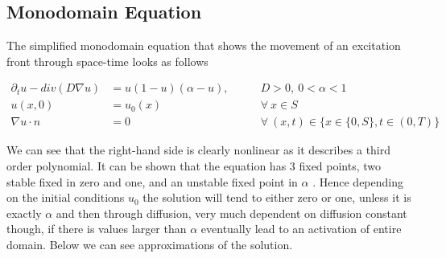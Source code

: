 \documentclass[../draft_1.tex]{subfiles}
\begin{document}
\subsection{Monodomain Equation}

The simplified monodomain equation that shows the movement of an excitation front through space-time looks as follows

\begin{ceqn}
	\begin{equation}
	\begin{aligned}
	\partial_t u - div(D \nabla u) &= u (1 - u ) (\alpha - u), \qquad &D > 0, \ 0 < \alpha < 1 \\
	u(x, 0) &= u_0(x) &\forall \ x \in S \\
	\nabla u \cdot n &= 0 \qquad &\forall \ (x,t) \in \{ x \in \{0,S\}, t \in (0,T) \} 
	\end{aligned}
	\end{equation}
\end{ceqn}
We can see that the right-hand side is clearly nonlinear as it describes a third order polynomial. It can be shown that the equation has 3 fixed points, two stable fixed in zero and one, and an unstable fixed point in $\alpha$ \cite{deuflhard2011adaptive}. Hence depending on the initial conditions $u_0$ the solution will tend to either zero or one, unless it is exactly $\alpha$ and then through diffusion, very much dependent on diffusion constant though, if there is values larger than $\alpha$ eventually lead to an activation of entire domain. Below we can see approximations of the solution.
\end{document}
